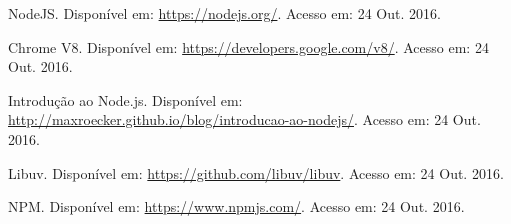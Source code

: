 \documentclass[brazil,ruledheader]{abntifes}
\begin{document}
\begin{thebibliography}{9}
		NodeJS. Disponível em: \url{https://nodejs.org/}.
		Acesso em: 24 Out. 2016.
		
		Chrome V8. Disponível em: \url{https://developers.google.com/v8/}.
		Acesso em: 24 Out. 2016.
		
		Introdução ao Node.js. Disponível em: \url{http://maxroecker.github.io/blog/introducao-ao-nodejs/}.
		Acesso em: 24 Out. 2016.
		
		Libuv. Disponível em: \url{https://github.com/libuv/libuv}.
		Acesso em: 24 Out. 2016.
		
		NPM. Disponível em: \url{https://www.npmjs.com/}.
		Acesso em: 24 Out. 2016.
		
	\end{thebibliography}
		\anexo
	
\end{document}
